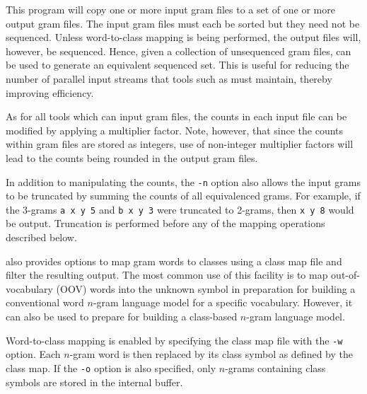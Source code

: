 %
%
%

\newpage
{}


This program will copy one or more input gram files to a set of one or
more output gram files. The input gram files must each be sorted but
they need not be sequenced. Unless word-to-class mapping is being
performed, the output files will, however, be sequenced. Hence, given
a collection of unsequenced gram files,  can be used to
generate an equivalent sequenced set. This is useful for reducing the
number of parallel input streams that tools such as 
must maintain, thereby improving efficiency.

As for all tools which can input gram files, the counts in each input
file can be modified by applying a multiplier factor.  Note, however,
that since the counts within gram files are stored as integers, use of
non-integer multiplier factors will lead to the counts being rounded
in the output gram files.

In addition to manipulating the counts, the \texttt{-n} option also
allows the input grams to be truncated by summing the counts of all
equivalenced grams. For example, if the 3-grams \texttt{a x y 5} and
\texttt{b x y 3} were truncated to 2-grams, then \texttt{x y 8} would
be output. Truncation is performed before any of the mapping
operations described below.

 also provides options to map gram words to classes
using a class map file and filter the resulting output.  The most
common use of this facility is to map out-of-vocabulary (OOV) words
into the unknown symbol in preparation for building a conventional
word $n$-gram language model for a specific vocabulary.  However, it can
also be used to prepare for building a class-based $n$-gram language
model.

Word-to-class mapping is enabled by specifying the class map file with
the \texttt{-w} option. Each $n$-gram word is then replaced by its class
symbol as defined by the class map. If the \texttt{-o} option is also
specified, only $n$-grams containing class symbols are stored in the 
internal buffer.


